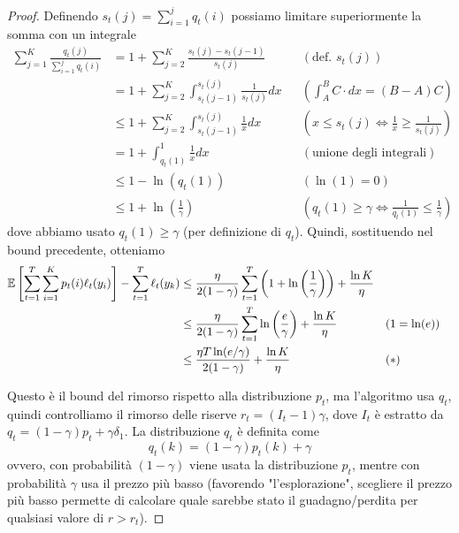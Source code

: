 \begin{proof}
    Definendo $s_t (j) = \sum_{i = 1}^j q_t (i)$ possiamo limitare superiormente la somma con un integrale
    \begin{align*}
        \sum_{j = 1}^K \frac{q_t (j)}{\sum_{i = 1}^j q_t (i)} & = 1 + \sum_{j = 2}^K \frac{s_t (j) - s_t (j-1)}{s_t(j)} && (\text{def. } s_t(j)) \\ 
        & = 1 + \sum_{j = 2}^K \int_{s_t (j-1)}^{s_t (j)} \frac{1}{s_t(j)} dx && \left(\int_{A}^B C \cdot dx = (B - A) C \right)\\
        & \leq 1 + \sum_{j = 2}^K \int_{s_t (j-1)}^{s_t (j)} \frac{1}{x} dx && \left(x \leq s_t (j) \Leftrightarrow \frac{1}{x} \geq \frac{1}{s_t (j)} \right) \\ 
        & = 1 + \int_{q_t (1)}^{1} \frac{1}{x} dx && \left(\text{unione degli integrali}\right)\\
        & \leq 1 - \ln \left(q_t (1)\right) && (\ln(1) = 0) \\ 
        & \leq 1 + \ln \left(\frac{1}{\gamma}\right) && \left(q_t(1) \geq \gamma \Leftrightarrow \frac{1}{q_t (1)} \leq \frac{1}{\gamma} \right)
    \end{align*}
    dove abbiamo usato $q_t (1) \geq \gamma$ (per definizione di $q_t$). Quindi, sostituendo nel bound precedente, otteniamo
    \begin{align*}
    	\mathbb{E} \left[\sum_{t = 1}^T \sum_{i = 1}^K p_t (i) \ell_t (y_i) \right] - \sum_{t = 1}^T \ell_t (y_k) & \leq \frac{\eta}{2 (1 - \gamma)} \sum_{t = 1}^T \left(1 + \ln \left(\frac{1}{\gamma}\right)\right) + \frac{\ln K}{\eta} \\
    	& \leq \frac{\eta}{2 (1 - \gamma)} \sum_{t = 1}^T \ln \left(\frac{e}{\gamma}\right) + \frac{\ln K}{\eta}  && (1 = \ln (e)) \\
    	& \leq \frac{\eta T \ln (e /\gamma)}{2 (1 - \gamma)} + \frac{\ln K}{\eta} && (\ast)
    \end{align*}
    
    Questo è il bound del rimorso rispetto alla distribuzione $p_t$, ma l'algoritmo usa $q_t$, quindi controlliamo il rimorso delle riserve $r_t = (I_t - 1) \gamma$, dove $I_t$ è estratto da $q_t = (1 - \gamma) p_t + \gamma \delta_1$. La distribuzione $q_t$ è definita come
    $$ q_t (k) = \left(1 - \gamma\right) p_t (k) + \gamma $$
    ovvero, con probabilità $(1 - \gamma)$ viene usata la distribuzione $p_t$, mentre con probabilità $\gamma$ usa il prezzo più basso (favorendo "l'esplorazione", scegliere il prezzo più basso permette di calcolare quale sarebbe stato il guadagno/perdita per qualsiasi valore di $r > r_t$).
    

\end{proof}
